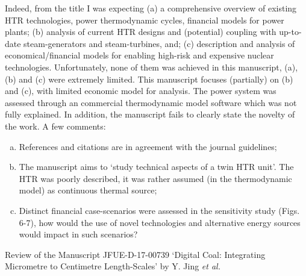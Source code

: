 \documentclass[14pt,twoside]{report}
\begin{document}
Indeed, from the title I was expecting (a) a comprehensive overview of existing HTR technologies, power thermodynamic cycles, financial models for power plants; (b) analysis of current HTR designs and (potential) coupling with up-to-date steam-generators and steam-turbines, and; (c) description and analysis of economical/financial models for enabling high-risk and expensive nuclear technologies. Unfortunately, none of them was achieved in this manuscript, (a), (b) and (c) were extremely limited. This manuscript focuses (partially) on (b) and (c), with limited economic model for analysis. The power system was assessed through an commercial thermodynamic model software which was not fully explained. In addition, the manuscript fails to clearly state the novelty of the work. A few comments:
\begin{enumerate}[(a)] 
%
    \item References and citations are in agreement with the journal guidelines;
    \item The manuscript aims to `study technical aspects of a twin HTR unit'. The HTR was poorly described, it was rather assumed (in the thermodynamic model) as continuous thermal source;
    \item Distinct financial case-scenarios were assessed in the sensitivity study (Figs. 6-7), how would the use of novel technologies and alternative energy sources would impact in such scenarios?
\end{enumerate}

{
  } 


\clearpage




\begin{center}
  {\Large Review of the Manuscript JFUE-D-17-00739 `Digital Coal: Integrating Micrometre to Centimetre Length-Scales' by Y. Jing {\it et al.}}
\end{center}
\end{document}
